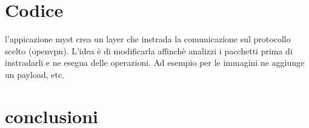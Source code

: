 \documentclass[]{article}
\begin{document}
	\section{Codice}
	l'appicazione myst crea un layer che instrada la comunicazione sul protocollo scelto (openvpn). L'idea è di modificarla affinchè analizzi i pacchetti prima di instradarli e ne esegua delle operazioni. Ad esempio per le immagini ne aggiunge un payload, etc.\\
	
	
	
	\section{conclusioni}
	
	
\end{document}
